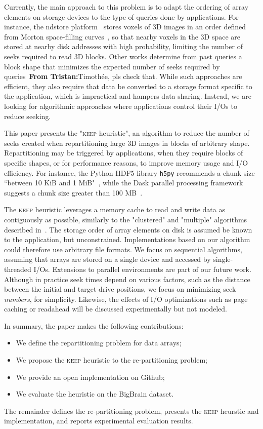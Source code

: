 \documentclass[sigconf, nonacm]{acmart}
\newcommand{\tristan}[1]{\color{orange}\textbf{From Tristan:}#1\color{black}}
\newcommand{\keep}[0]{\textsc{keep}\xspace}
\begin{document}
Currently, the main approach to this problem is to adapt the ordering of array
elements on storage devices to the type of queries done by applications.
For instance, the ndstore platform~\cite{ndstore} stores voxels of 3D images
in an order defined from Morton space-filling curves~\cite{morton}, so that nearby
voxels in the 3D space are stored at nearby disk addresses with high
probability, limiting the number of seeks required to read 3D blocks. Other works determine from past queries a
block shape that minimizes the expected number of seeks required
by queries~\cite{optimal_chuking}\tristan{Timothée, pls check that}.
While such approaches are efficient, they also require that data
be converted to a storage format specific to the application, which is
impractical and hampers data sharing. Instead, we are looking for
algorithmic approaches where applications control their I/Os to reduce seeking.

This paper presents the "\keep heuristic", an algorithm to reduce the
number of seeks created when repartitioning large 3D images in blocks of
arbitrary shape. Repartitioning may be triggered by applications, when they
require blocks of specific shapes, or for performance reasons, to improve
memory usage and I/O efficiency. For instance, the Python HDF5 library
\texttt{h5py} recommends a chunk size ``between 10 KiB and 1
MiB"~\cite{collette_2014}, while the Dask parallel processing framework
~\cite{matthew_rocklin-proc-scipy-2015} suggests a chunk size greater than
100 MB~\cite{rocklin_bourbeau_2019}.

The \keep heuristic leverages a memory cache to read and write data as
contiguously as possible, similarly to the "clustered" and "multiple"
algorithms described in~\cite{seqalgorithms}. The storage order of array
elements on disk is assumed be known to the application, but unconstrained.
Implementations based on our algorithm could therefore use arbitrary file
formats. We focus on sequential algorithms, assuming that arrays are stored
on a single device and accessed by single-threaded I/Os. Extensions to parallel
environments are part of our future work. Although in practice seek times
depend on various factors, such as the distance between the initial and
target drive positions, we focus on minimizing seek \emph{numbers}, for
simplicity. Likewise, the effects of I/O optimizations such as page caching
or readahead will be discussed experimentally but not modeled.

In summary, the paper makes the following contributions:
\begin{itemize}
  \item We define the repartitioning problem for data arrays;
  \item We propose the \keep heuristic to the re-partitioning problem;
  \item We provide an open implementation on Github;
  \item We evaluate the heuristic on the BigBrain dataset.
\end{itemize}
The remainder defines the re-partitioning problem, presents the \keep heurstic and implementation, 
and reports experimental evaluation results.
\end{document}
